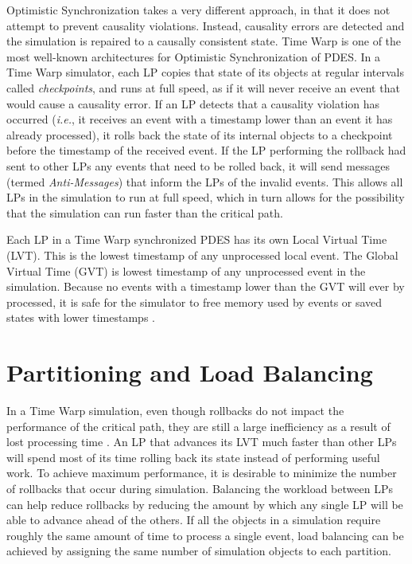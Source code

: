 \documentclass[11pt]{book}
\begin{document}
Optimistic Synchronization takes a very different approach, in that it does not attempt to prevent causality violations. Instead, causality errors are detected and the simulation is repaired to a causally consistent state. Time Warp \cite{jefferson-85} is one of the most well-known architectures for Optimistic Synchronization of PDES. In a Time Warp simulator, each LP copies that state of its objects at regular intervals called \emph{checkpoints}, and runs at full speed, as if it will never receive an event that would cause a causality error. If an LP detects that a causality violation has occurred (\emph{i.e.}, it receives an event with a timestamp lower than an event it has already processed), it rolls back the state of its internal objects to a checkpoint before the timestamp of the received event. If the LP performing the rollback had sent to other LPs any events that need to be rolled back, it will send messages (termed \emph{Anti-Messages}) that inform the LPs of the invalid events. This allows all LPs in the simulation to run at full speed, which in turn allows for the possibility that the simulation can run faster than the critical path. 

Each LP in a Time Warp synchronized PDES has its own Local Virtual Time (LVT). This is the lowest timestamp of any unprocessed local event. The Global Virtual Time (GVT) is lowest timestamp of any unprocessed event in the simulation. Because no events with a timestamp lower than the GVT will ever by processed, it is safe for the simulator to free memory used  by events or saved states with lower timestamps \cite{fujimoto-90}.


\section{Partitioning and Load Balancing}

In a Time Warp simulation, even though rollbacks do not impact the performance of the critical path, they are still a large inefficiency as a result of lost processing time \cite{chetlur-06}. An LP that advances its LVT much faster than other LPs will spend most of its time rolling back its state instead of performing useful work. To achieve maximum performance, it is desirable to minimize the number of rollbacks that occur during simulation. Balancing the workload between LPs can help reduce rollbacks by reducing the amount by which any single LP will be able to advance ahead of the others. If all the objects in a simulation require roughly the same amount of time to process a single event, load balancing can be achieved by assigning the same number of simulation objects to each partition.
\end{document}
